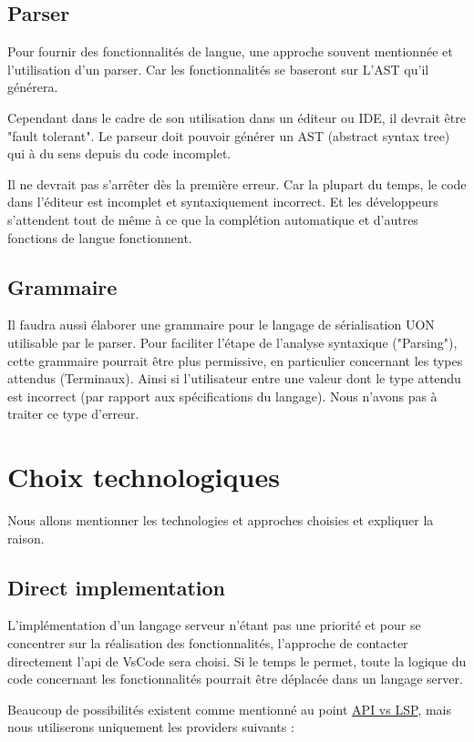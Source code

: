 \documentclass[
    iict, %
    il, %
]{heig-tb}
\begin{document}
\subsection{Parser}
Pour fournir des fonctionnalités de langue, une approche souvent mentionnée et l'utilisation d'un parser.
Car les fonctionnalités se baseront sur L'AST qu'il générera.

Cependant dans le cadre de son utilisation dans un éditeur ou IDE, il devrait être "fault tolerant". Le parseur doit pouvoir générer un AST (abstract syntax tree) qui à du sens depuis du code incomplet.

Il ne devrait pas s'arrêter dès la première erreur. Car la plupart du temps, le code dans l'éditeur est incomplet et syntaxiquement incorrect.
Et les développeurs s'attendent tout de même à ce que la complétion automatique et d'autres fonctions de langue fonctionnent.

\subsection{Grammaire}
Il faudra aussi élaborer une grammaire pour le langage de sérialisation UON utilisable par le parser.
Pour faciliter l'étape de l'analyse syntaxique ("Parsing"), cette grammaire pourrait être plus permissive, en particulier concernant les types attendus (Terminaux).
Ainsi si l'utilisateur entre une valeur dont le type attendu est incorrect (par rapport aux spécifications du langage). Nous n'avons pas à traiter ce type d'erreur.

\section{Choix technologiques}
Nous allons mentionner les technologies et approches choisies et expliquer la raison.

\subsection{Direct implementation}
L'implémentation d'un langage serveur n'étant pas une priorité et pour se concentrer sur la réalisation des fonctionnalités, l'approche de contacter directement l'api de VsCode sera choisi.
Si le temps le permet, toute la logique du code concernant les fonctionnalités pourrait être déplacée dans un langage server.

Beaucoup de possibilités existent comme mentionné au point \hyperref[api vs lsp]{API vs LSP}, mais nous utiliserons uniquement les providers suivants :
\end{document}

